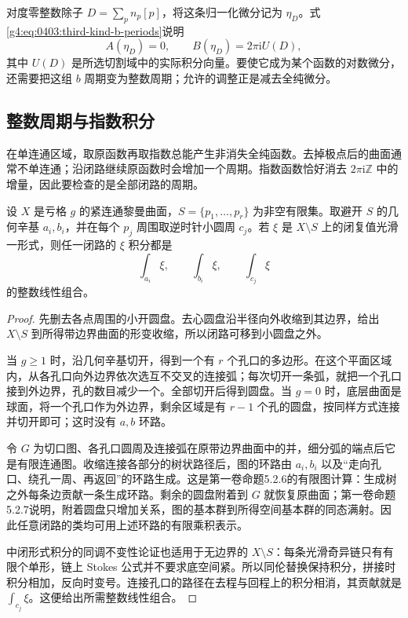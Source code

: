 \ProseParagraphBreak

对度零整数除子 \(D=\sum_p n_p[p]\)，将这条归一化微分记为 \(\eta_D\)。式\eqref{g4:eq:0403:third-kind-b-periods}说明
\[
	A(\eta_D)=0,\qquad
	B(\eta_D)=2\pi\mathrm{i}U(D),
\]
其中 \(U(D)\) 是所选切割域中的实际积分向量。要使它成为某个函数的对数微分，还需要把这组 \(b\) 周期变为整数周期；允许的调整正是减去全纯微分。

\subsection{整数周期与指数积分}
\label{g4:subsec:0403:03}
在单连通区域，取原函数再取指数总能产生非消失全纯函数。去掉极点后的曲面通常不单连通；沿闭路继续原函数时会增加一个周期。指数函数恰好消去 \(2\pi\mathrm{i}\mathbb Z\) 中的增量，因此要检查的是全部闭路的周期。

\begin{lemma}
	\label{g4:lem:0403:punctured-periods}
	设 \(X\) 是亏格 \(g\) 的紧连通黎曼曲面，\(S=\{p_1,\ldots,p_r\}\) 为非空有限集。取避开 \(S\) 的几何辛基 \(a_i,b_i\)，并在每个 \(p_j\) 周围取逆时针小圆周 \(c_j\)。若 \(\xi\) 是 \(X\setminus S\) 上的闭复值光滑一形式，则任一闭路的 \(\xi\) 积分都是
	\[
		\int_{a_i}\xi,\qquad\int_{b_i}\xi,\qquad\int_{c_j}\xi
	\]
	的整数线性组合。
\end{lemma}
\begin{proof}
	先删去各点周围的小开圆盘。去心圆盘沿半径向外收缩到其边界，给出 \(X\setminus S\) 到所得带边界曲面的形变收缩，所以闭路可移到小圆盘之外。

	当 \(g\ge1\) 时，沿几何辛基切开，得到一个有 \(r\) 个孔口的多边形。在这个平面区域内，从各孔口向外边界依次选互不交叉的连接弧；每次切开一条弧，就把一个孔口接到外边界，孔的数目减少一个。全部切开后得到圆盘。当 \(g=0\) 时，底层曲面是球面，将一个孔口作为外边界，剩余区域是有 \(r-1\) 个孔的圆盘，按同样方式连接并切开即可；这时没有 \(a,b\) 环路。

	令 \(G\) 为切口图、各孔口圆周及连接弧在原带边界曲面中的并，细分弧的端点后它是有限连通图。收缩连接各部分的树状路径后，图的环路由 \(a_i,b_i\) 以及“走向孔口、绕孔一周、再返回”的环路生成。这是第一卷命题5.2.6的有限图计算：生成树之外每条边贡献一条生成环路。剩余的圆盘附着到 \(G\) 就恢复原曲面；第一卷命题5.2.7说明，附着圆盘只增加关系，图的基本群到所得空间基本群的同态满射。因此任意闭路的类均可用上述环路的有限乘积表示。

	中闭形式积分的同调不变性论证也适用于无边界的 \(X\setminus S\)：每条光滑奇异链只有有限个单形，链上 Stokes 公式并不要求底空间紧。所以同伦替换保持积分，拼接时积分相加，反向时变号。连接孔口的路径在去程与回程上的积分相消，其贡献就是 \(\int_{c_j}\xi\)。这便给出所需整数线性组合。
\end{proof}

